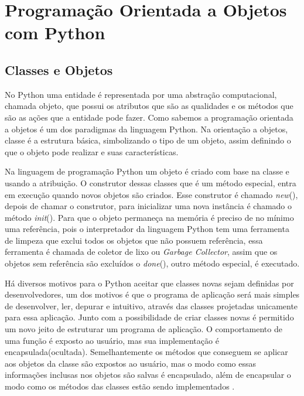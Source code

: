 

\chapter{ Programação Orientada a Objetos com Python}



    \section{Classes e Objetos}
	 No Python uma entidade é representada por uma abstração computacional, chamada objeto, que possui os atributos que são as qualidades e os métodos que são as ações que a entidade pode fazer. Como sabemos a programação orientada a objetos é um dos paradigmas da linguagem Python. Na orientação a objetos, classe é a estrutura básica, simbolizando o tipo de um objeto, assim definindo o que o objeto pode realizar e suas características.
	 
	 Na linguagem de programação Python um objeto é criado com base na classe e usando a atribuição. O construtor dessas classes que é um método especial, entra em execução quando novos objetos são criados. Esse construtor é chamado \textunderscore \textit{new}\textunderscore(), depois de chamar o construtor, para inicializar uma nova instância é chamado o método \textunderscore \textit{init}\textunderscore(). Para que o objeto permaneça na memória é preciso de no mínimo uma referência, pois o interpretador da linguagem Python tem uma ferramenta de limpeza que exclui todos os objetos que não possuem referência, essa ferramenta é chamada de coletor de lixo ou \textit{Garbage Collector}, assim que os objetos sem referência são excluídos o \textunderscore \textit{done}\textunderscore(), outro método especial, é executado.
	 
	Há diversos motivos para o Python aceitar que classes novas sejam definidas por desenvolvedores, um dos motivos é que o programa de aplicação será mais simples de desenvolver, ler, depurar e intuitivo, através das classes projetadas unicamente para essa aplicação. Junto com a possibilidade de criar classes novas é permitido um novo jeito de estruturar um programa de aplicação. O comportamento de uma função é exposto ao usuário, mas sua implementação é encapsulada(ocultada). Semelhantemente os métodos que conseguem se aplicar aos objetos da classe são expostos ao usuário, mas o modo como essas informações inclusas nos objetos são salvas é encapsulado, além de encapsular o modo como os métodos das classes estão sendo implementados \cite{Borges2014}.
	
